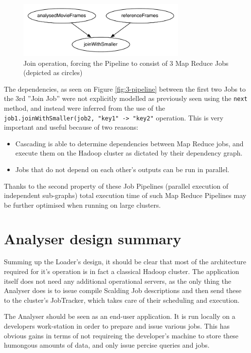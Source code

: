 \begin{figure}[ch!]
  \centering
  \includegraphics[width=0.75\textwidth]{img/second-simplest-pipeline}
  \caption{Join operation, forcing the Pipeline to consist of 3 Map Reduce Jobs (depicted as circles)}
\end{figure}


The dependencies, as seen on Figure \ref{fig:3-pipeline} between the first two Jobs to the 3rd ''Join Job'' were not explicitly modelled as previously seen using the \verb|next| method, and instead were inferred from the use of the \verb|job1.joinWithSmaller(job2, "key1" -> "key2"| operation. This is very important and useful because of two reasons:

\begin{itemize}
  \item Cascading is able to determine dependencies between Map Reduce jobs, and execute them on the Hadoop cluster as dictated by their dependency graph.
  \item Jobs that do not depend on each other's outputs can be run in parallel.
\end{itemize}

Thanks to the second property of these Job Pipelines (parallel execution of independent sub-graphs) total execution time of such Map Reduce Pipelines may be further optimised when running on large clusters.

\section{Analyser design summary}
Summing up the Loader's design, it should be clear that most of the architecture required for it's operation is in fact a classical Hadoop cluster. The application itself does not need any additional operational servers, as the only thing the Analyser does is to issue compile Scalding Job descriptions and then send these to the cluster's JobTracker, which takes care of their scheduling and execution. 

The Analyser should be seen as an end-user application. It is run locally on a developers work-station in order to prepare and issue various jobs. This has obvious gains in terms of not requireing the developer's machine to store these humongous amounts of data, and only issue percise queries and jobs.







